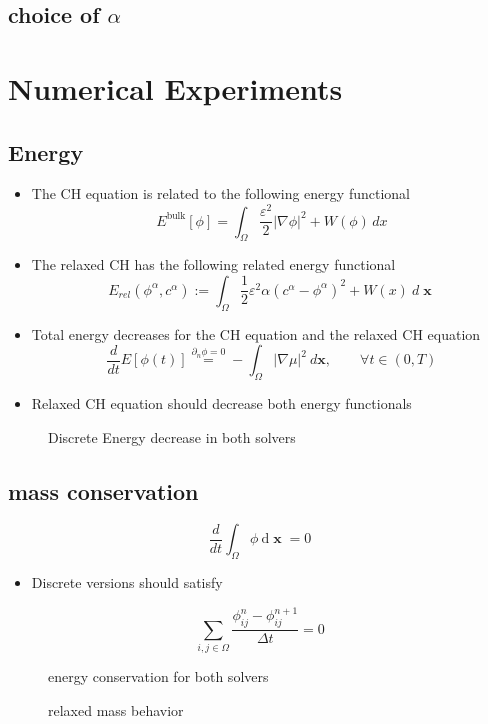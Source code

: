 \documentclass[11pt]{article}
\begin{document}
\subsection*{choice of \(\alpha\)}
\label{sec:orgeb497bd}
\begin{center}

\label{fig:alpha-error}
\end{center}
\section*{Numerical Experiments}
\label{sec:orga13f457}
\subsection*{Energy}
\label{sec:orgdcdbae9}
\begin{itemize}
\item The CH equation is related to the following energy functional
\[E^{\text{bulk}}[\phi] = \int_{\Omega} \frac{\varepsilon^2}{2} |\nabla \phi |^2 + W(\phi) \, dx  \]
\item The relaxed CH has the following related energy functional
\[E_{rel}(\phi^{\alpha} , c^\alpha) := \int_{\Omega}  \frac{1}{2}\varepsilon^2 \alpha (c^\alpha - \phi^{\alpha})^2 + W(x) \ d \operatorname{\mathbf{x}} \]
\item Total energy decreases for the CH equation and the relaxed CH equation
\[\frac{d}{dt}E[\phi(t)]  \stackrel{\partial_n\phi = 0}{=} - \int_{ \Omega } |\nabla \mu|^2 \ d \mathbf{x}, \qquad \forall t \in (0,T) \]
\item Relaxed CH equation should decrease both energy functionals
\end{itemize}
\begin{figure}[htbp]
\centering

\caption{\label{fig:relaxed-energy-balance}Discrete Energy decrease in both solvers}
\end{figure}
\subsection*{mass conservation}
\label{sec:org8135f88}
\begin{equation}
\frac{d}{d t} \int_{\Omega} \phi ~\mathrm{d} \operatorname{\mathbf{x}} = 0
\end{equation}
\begin{itemize}
\item Discrete versions should satisfy
\end{itemize}
\begin{equation}
\sum_{i,j \in \Omega} \frac{\phi_{ij}^{n} - \phi_{ij}^{n+1}}{\Delta t} = 0
\end{equation}
\begin{figure}[htbp]
\centering

\caption{\label{fig:mass-balance}energy conservation for both solvers}
\end{figure}
\begin{figure}[htbp]
\centering

\caption{\label{fig:relaxed-mass-balance}relaxed mass behavior}
\end{figure}
\end{document}

